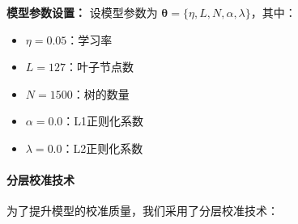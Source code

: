 \documentclass[12pt,a4paper]{ctexart}
\numberwithin{equation}{section}
\theoremstyle{mcm}
\begin{document}
\textbf{模型参数设置：}
设模型参数为 $\boldsymbol{\theta} = \{\eta, L, N, \alpha, \lambda\}$，其中：
\begin{itemize}
\item $\eta = 0.05$：学习率
\item $L = 127$：叶子节点数
\item $N = 1500$：树的数量
\item $\alpha = 0.0$：L1正则化系数
\item $\lambda = 0.0$：L2正则化系数
\end{itemize}

\paragraph{分层校准技术}

为了提升模型的校准质量，我们采用了分层校准技术：
\end{document}
